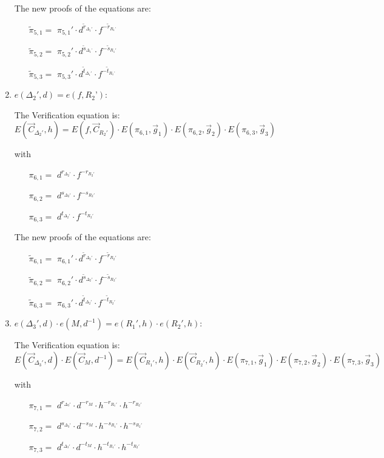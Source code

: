\begin{description}
\begin{enumerate}
    The new proofs of the equations are:
    \begin{itemize}
    \item[$\tilde{\pi}_{5,1} = $] $\pi_{5,1}' \cdot d^{\tilde{r}_{\Delta_1'}} \cdot f^{-\tilde{r}_{R_1’}}$
    \item[$\tilde{\pi}_{5,2} = $] $\pi_{5,2}' \cdot d^{\tilde{s}_{\Delta_1’}} \cdot f^{-\tilde{s}_{R_1'}}$
    \item[$\tilde{\pi}_{5,3} = $] $\pi_{5,3}' \cdot d^{\tilde{t}_{\Delta_1'}} \cdot f^{-\tilde{t}_{R_1’}}$
    \end{itemize}

  \item $e(\boxed{\Delta_2'},d) = e(f, \boxed{R_2’})$:

    The Verification equation is:  $E(\vec{C}_{\Delta_2'}, h) = E(f, \vec{C}_{R_2'}) \cdot E(\pi_{6,1}, \vec{g}_1)\cdot E(\pi_{6,2}, \vec{g}_2)\cdot E(\pi_{6,3}, \vec{g}_3)$

    with
    \begin{itemize}
    \item[$\pi_{6,1} = $] $d^{r_{\Delta_2'}} \cdot f^{-r_{R_2'}}$
    \item[$\pi_{6,2} = $] $d^{s_{\Delta_2'}} \cdot f^{-s_{R_2'}}$
    \item[$\pi_{6,3} = $] $d^{t_{\Delta_2'}} \cdot f^{-t_{R_2'}}$
    \end{itemize}

    The new proofs of the equations are:
    \begin{itemize}
    \item[$\tilde{\pi}_{6,1} = $] $\pi_{6,1}' \cdot d^{\tilde{r}_{\Delta_2'}} \cdot f^{-\tilde{r}_{R_2'}}$
    \item[$\tilde{\pi}_{6,2} = $] $\pi_{6,2}' \cdot d^{\tilde{s}_{\Delta_2'}} \cdot f^{-\tilde{s}_{R_2'}}$
    \item[$\tilde{\pi}_{6,3} = $] $\pi_{6,3}' \cdot d^{\tilde{t}_{\Delta_2'}} \cdot f^{-\tilde{t}_{R_2'}}$
    \end{itemize}

  \item $e(\boxed{\Delta_3'},d) \cdot e(\boxed{M}, d^{-1})= e(\boxed{R_1'}, h) \cdot e(\boxed{R_2'}, h)$:
    
    The Verification equation is:  $E(\vec{C}_{\Delta_3'}, d) \cdot E(\vec{C}_M, d^{-1})= E(\vec{C}_{R_1'}, h) \cdot E(\vec{C}_{R_2'}, h) \cdot E(\pi_{7,1}, \vec{g}_1)\cdot E(\pi_{7,2}, \vec{g}_2)\cdot E(\pi_{7,3}, \vec{g}_3)$
    
    with
    \begin{itemize}
    \item[$\pi_{7,1} = $] $d^{r_{\Delta_3'}} \cdot d^{-r_M} \cdot h^{-r_{R_1'}} \cdot h^{-r_{R_2'}}$
    \item[$\pi_{7,2} = $] $d^{s_{\Delta_3'}} \cdot d^{-s_M} \cdot h^{-s_{R_1'}} \cdot h^{-s_{R_2'}}$
    \item[$\pi_{7,3} = $] $d^{t_{\Delta_3'}} \cdot d^{-t_M} \cdot h^{-t_{R_1'}} \cdot h^{-t_{R_2'}}$
    \end{itemize}   


\end{enumerate}
\end{description}
